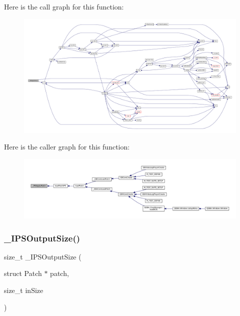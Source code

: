 Here is the call graph for this function\+:
\nopagebreak
\begin{figure}[H]
\begin{center}
\leavevmode
\includegraphics[width=350pt]{patch-ips_8c_ad571623fdebecb3eb9d9bf7d1c56569e_cgraph}
\end{center}
\end{figure}
Here is the caller graph for this function\+:
\nopagebreak
\begin{figure}[H]
\begin{center}
\leavevmode
\includegraphics[width=350pt]{patch-ips_8c_ad571623fdebecb3eb9d9bf7d1c56569e_icgraph}
\end{center}
\end{figure}
\mbox{\label{patch-ips_8c_a7a563fa349ed7b67a6d504fd40efc92e}} 
\subsubsection{\texorpdfstring{\+\_\+\+I\+P\+S\+Output\+Size()}{\_IPSOutputSize()}}
{\footnotesize\ttfamily size\+\_\+t \+\_\+\+I\+P\+S\+Output\+Size (\begin{DoxyParamCaption}\item[{struct Patch $\ast$}]{patch,  }\item[{size\+\_\+t}]{in\+Size }\end{DoxyParamCaption})\hspace{0.3cm}{\ttfamily [static]}}

